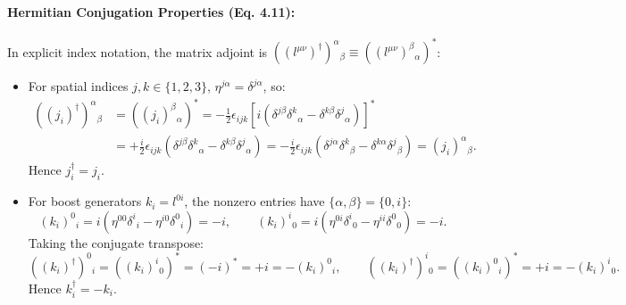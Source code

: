 \documentclass[11pt,a4paper]{article}
\begin{document}
\paragraph{Hermitian Conjugation Properties (Eq. 4.11):}
In explicit index notation, the matrix adjoint is $((l^{\mu\nu})^\dagger)^\alpha{}_\beta \equiv ((l^{\mu\nu})^\beta{}_\alpha)^*$:
\begin{itemize}
    \item For spatial indices $j,k \in \{1,2,3\}$, $\eta^{j\alpha} = \delta^{j\alpha}$, so:
    \begin{align}
        \left((j_i)^\dagger\right)^\alpha{}_\beta &= \left((j_i)^\beta{}_\alpha\right)^* = -\frac{1}{2}\epsilon_{ijk}\left[i\left(\delta^{j\beta}\delta^k{}_\alpha - \delta^{k\beta}\delta^j{}_\alpha\right)\right]^* \nonumber \\
        &= +\frac{i}{2}\epsilon_{ijk}\left(\delta^{j\beta}\delta^k{}_\alpha - \delta^{k\beta}\delta^j{}_\alpha\right) = -\frac{i}{2}\epsilon_{ijk}\left(\delta^{j\alpha}\delta^k{}_\beta - \delta^{k\alpha}\delta^j{}_\beta\right) = (j_i)^\alpha{}_\beta.
    \end{align}
    Hence $j_i^\dagger = j_i$.
    \item For boost generators $k_i = l^{0i}$, the nonzero entries have $\{\alpha,\beta\} = \{0,i\}$:
    \begin{equation}
        (k_i)^0{}_i = i(\eta^{00}\delta^i{}_i - \eta^{i0}\delta^0{}_i) = -i, \qquad (k_i)^i{}_0 = i(\eta^{0i}\delta^i{}_0 - \eta^{ii}\delta^0{}_0) = -i.
    \end{equation}
    Taking the conjugate transpose:
    \begin{equation}
        \left((k_i)^\dagger\right)^0{}_i = \left((k_i)^i{}_0\right)^* = (-i)^* = +i = -(k_i)^0{}_i, \qquad \left((k_i)^\dagger\right)^i{}_0 = \left((k_i)^0{}_i\right)^* = +i = -(k_i)^i{}_0.
    \end{equation}
    Hence $k_i^\dagger = -k_i$.
\end{itemize}
\end{document}
